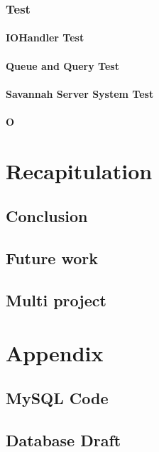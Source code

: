     \subsection{Test}
	
	\subsubsection{IOHandler Test}
	
        \subsubsection{Queue and Query Test}
	
	\subsubsection{Savannah Server System Test}
	
	\subsubsection{O}

\chapter{Recapitulation}
\label{recap}
  \section{Conclusion}
  \section{Future work}
  \section{Multi project} %

\appendix
	\chapter{Appendix}
	\section{MySQL Code}
	\label{MySQLcode}
		
	\section{Database Draft}
		\label{sec:Databasedrafts}
		
